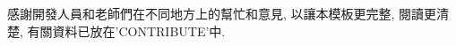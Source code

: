 \StartAcknowledgmentsChi

感謝開發人員和老師們在不同地方上的幫忙和意見, 以讓本模板更完整, 閱讀更清楚, 有關資料已放在'CONTRIBUTE'中.


\EndAcknowledgments

